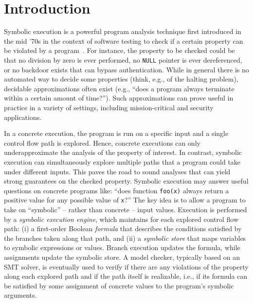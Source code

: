 
\section{Introduction}

Symbolic execution is a powerful program analysis technique first introduced in the mid '70s in the context of software testing to check if a certain property can be violated by a program~\cite{K-ICRS75,SELECT-ICRS75,K-CACM76,H-TSE77}. For instance, the property to be checked could be that no division by zero is ever performed, no {\tt NULL} pointer is ever dereferenced, or no backdoor exists that can bypass authentication. While in general there is no automated way to decide some properties (think, e.g., of the halting problem),  decidable approximations often exist (e.g., ``does a program always terminate within a certain amount of time?''). Such approximations can prove useful in practice in a variety of settings, including mission-critical and security applications.

In a concrete execution, the program is run on a specific input and a single control flow path is explored. Hence, concrete executions can only underapproximate the analysis of the property of interest. In contrast, symbolic execution can simultaneously explore multiple paths that a program could take under different inputs. This paves the road to sound analyses that can yield strong guarantees on the checked property. Symbolic execution may answer useful questions on concrete programs like: ``does function {\tt foo(x)} always return a positive value for any possible value of {\tt x}?'' The key idea is to allow a program to take on ``symbolic'' -- rather than concrete -- input values. Execution is performed by a {\em symbolic execution engine}, which maintains for each explored control flow path: (i) a first-order Boolean {\em formula} that describes the conditions satisfied by the branches taken along that path, and (ii) a {\em symbolic store} that maps variables to symbolic expressions or values. Branch execution updates the formula, while assignments update the symbolic store. A model checker, typically based on an SMT solver, is eventually used to verify if there are any violations of the property along each explored path and if the path itself is realizable, i.e., if its formula can be satisfied by some assignment of concrete values to the program's symbolic arguments.

